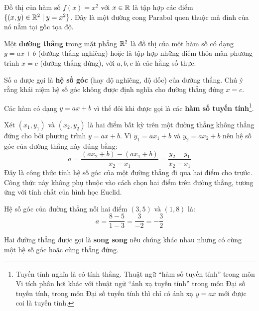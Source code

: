 \begin{example}
    Đồ thị của hàm số $f(x) = x^2$ với $x \in \mathbb{R}$ là tập hợp các điểm $\{(x, y) \in \mathbb{R}^2 \mid y = x^2\}$. Đây là một đường cong Parabol quen thuộc mà đỉnh của nó nằm tại gốc tọa độ.
\end{example}

Một \textbf{đường thẳng} trong mặt phẳng $\mathbb{R}^2$ là đồ thị của một hàm số có dạng $y = ax + b$ (đường thẳng nghiêng) hoặc là tập hợp những điểm thỏa mãn phương trình $x = c$ (đường thẳng đứng), với $a, b, c$ là các hằng số thực.

Số $a$ được gọi là \textbf{hệ số góc} (hay độ nghiêng, độ dốc) của đường thẳng. Chú ý rằng khái niệm hệ số góc không được định nghĩa cho đường thẳng đứng $x=c$.

Các hàm có dạng $y = ax + b$ vì thế đôi khi được gọi là các \textbf{hàm số tuyến tính}\footnote{Tuyến tính nghĩa là có tính thẳng. Thuật ngữ ``hàm số tuyến tính'' trong môn Vi tích phân hơi khác với thuật ngữ ``ánh xạ tuyến tính'' trong môn Đại số tuyến tính, trong môn Đại số tuyến tính thì chỉ có ánh xạ $y=ax$ mới được coi là tuyến tính.}.

Xét $(x_1, y_1)$ và $(x_2, y_2)$ là hai điểm bất kỳ trên một đường thẳng không thẳng đứng cho bởi phương trình $y = ax + b$. Vì $y_1 = ax_1 + b$ và $y_2 = ax_2 + b$ nên hệ số góc của đường thẳng này đúng bằng:
\[
a = \dfrac{(ax_2 + b) - (ax_1 + b)}{x_2 - x_1} = \dfrac{y_2 - y_1}{x_2 - x_1}
\]
Đây là công thức tính hệ số góc của một đường thẳng đi qua hai điểm cho trước. Công thức này không phụ thuộc vào cách chọn hai điểm trên đường thẳng, tương ứng với tính chất của hình học Euclid.


\begin{example}
    Hệ số góc của đường thẳng nối hai điểm $(3, 5)$ và $(1, 8)$ là:
    \[
    a = \dfrac{8 - 5}{1 - 3} = \dfrac{3}{-2} = -\dfrac{3}{2}
    \]
\end{example}

Hai đường thẳng được gọi là \textbf{song song} nếu chúng khác nhau nhưng có cùng một hệ số góc hoặc cùng thẳng đứng.

